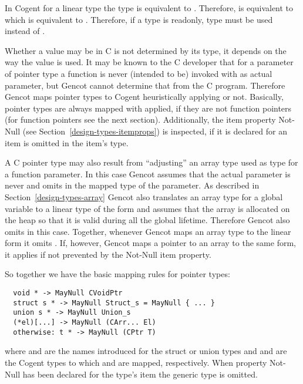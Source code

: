 In Cogent for a linear type  the type  is equivalent to . Therefore,  is 
equivalent to  which is equivalent to . Therefore, if a type  is readonly,
type  must be used instead of .

Whether a value may be  in C is not determined by its type, it depends on the way the value is used. It may be known
to the C developer that for a parameter of pointer type a function is never (intended to be) invoked with  as actual
parameter, but Gencot cannot determine that from the C program. Therefore Gencot maps pointer types to Cogent heuristically 
applying  or not. Basically, pointer types are always mapped with  applied, if they are not 
function pointers (for function pointers see the next section). Additionally, the item property Not-Null (see 
Section~\ref{design-types-itemprops}) is inspected, if it is declared for an item  is omitted in the item's type. 

A C pointer type may also result from ``adjusting'' an array type used as type for a function parameter. In this case Gencot
assumes that the actual parameter is never  and omits  in the mapped type of the parameter.
As described in Section~\ref{design-types-array} Gencot also translates an array type for a global variable to a linear
type of the form  and assumes that the array is allocated on the heap so that it is valid during all 
the global lifetime. Therefore Gencot also omits  in this case. Together, whenever Gencot maps an array type
to the linear form  it omits . If, however, Gencot maps a pointer to an array to the 
same form, it applies  if not prevented by the Not-Null item property.

So together we have the basic mapping rules for pointer types:
\begin{verbatim}
  void * -> MayNull CVoidPtr
  struct s * -> MayNull Struct_s = MayNull { ... }
  union s * -> MayNull Union_s
  (*el)[...] -> MayNull (CArr... El)
  otherwise: t * -> MayNull (CPtr T)
\end{verbatim}
where  and  are the names introduced for the struct or union types and  
and  are the Cogent types to which  and  are mapped, respectively. When property
Not-Null has been declared for the type's item the generic type  is omitted.

